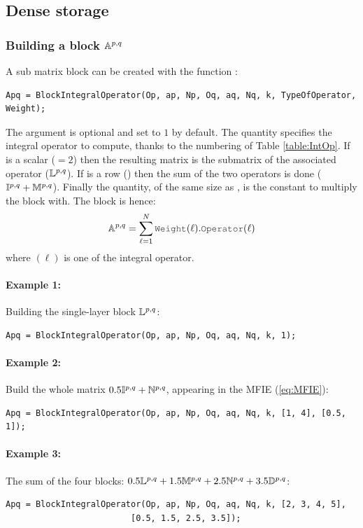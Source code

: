 \subsection{Dense storage}
\subsubsection{Building a block $\mathbb{A}^{p,q}$}
\label{secFun:BlockIntegralOperator}

A sub matrix block can be created with the function \BlockIntegralOperator:
\begin{lstlisting}
Apq = BlockIntegralOperator(Op, ap, Np, Oq, aq, Nq, k, TypeOfOperator, Weight);
\end{lstlisting}
The  argument is optional and set to $1$ by default. The quantity  specifies the integral operator to compute, thanks to the numbering of Table \ref{table:IntOp}. If  is a scalar (\eg $=2$) then the resulting matrix  is the submatrix of the associated operator (\eg $\mathbb{L}^{p,q}$). If  is a row (\eg \code{[1,3]}) then the sum of the two operators is done (\eg $\mathbb{I}^{p,q}+\mathbb{M}^{p,q}$). Finally the  quantity, of the same size as , is the constant to multiply the block with. The block is hence:
$$
\Abpq = \sum_{\ell=1}^{N}\code{Weight}(\ell).\code{Operator}(\ell)
$$
where $(\ell)$ is one of the integral operator.

\paragraph{Example 1:} Building the single-layer block $\mathbb{L}^{p,q}$:
\begin{lstlisting}
Apq = BlockIntegralOperator(Op, ap, Np, Oq, aq, Nq, k, 1);
\end{lstlisting}
\paragraph{Example 2:} Build the whole matrix $0.5\mathbb{I}^{p,q} + \mathbb{N}^{p,q}$, appearing in the MFIE (\ref{eq:MFIE}):
\begin{lstlisting}
Apq = BlockIntegralOperator(Op, ap, Np, Oq, aq, Nq, k, [1, 4], [0.5, 1]);
\end{lstlisting}
\paragraph{Example 3:} The sum of the four blocks: $0.5\mathbb{L}^{p,q} + 1.5\mathbb{M}^{p,q} + 2.5\mathbb{N}^{p,q} + 3.5\mathbb{D}^{p,q}$:
\begin{lstlisting}
Apq = BlockIntegralOperator(Op, ap, Np, Oq, aq, Nq, k, [2, 3, 4, 5], 
                         [0.5, 1.5, 2.5, 3.5]);
\end{lstlisting}


